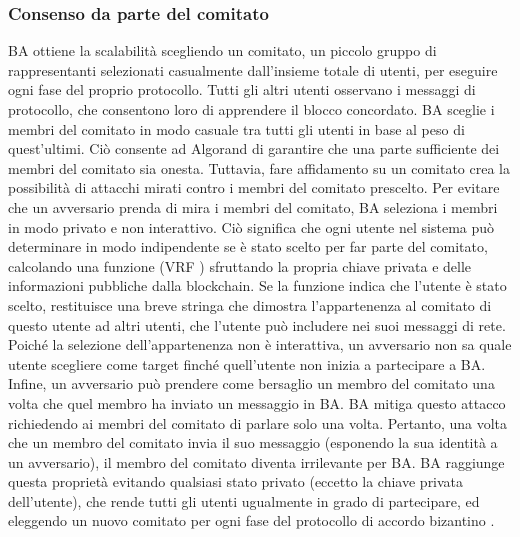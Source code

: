 \subsubsection{Consenso da parte del comitato}
BA ottiene la scalabilità scegliendo un comitato, un piccolo gruppo di rappresentanti selezionati casualmente dall'insieme totale di utenti, per eseguire ogni fase del proprio protocollo. Tutti gli altri utenti osservano i messaggi di protocollo, che consentono loro di apprendere il blocco concordato. BA sceglie i membri del comitato in modo casuale tra tutti gli utenti in base al peso di quest'ultimi. Ciò consente ad Algorand di garantire che una parte sufficiente dei membri del comitato sia onesta. Tuttavia, fare affidamento su un comitato crea la possibilità di attacchi mirati contro i membri del comitato prescelto. Per evitare che un avversario prenda di mira i membri del comitato, BA seleziona i membri in modo privato e non interattivo. Ciò significa che ogni utente nel sistema può determinare in modo indipendente se è stato scelto per far parte del comitato, calcolando una funzione (VRF \cite{814584}) sfruttando la propria chiave privata e delle informazioni pubbliche dalla blockchain. Se la funzione indica che l'utente è stato scelto, restituisce una breve stringa che dimostra l'appartenenza al comitato di questo utente ad altri utenti, che l'utente può includere nei suoi messaggi di rete. Poiché la selezione dell'appartenenza non è interattiva, un avversario non sa quale utente scegliere come target finché quell'utente non inizia a partecipare a BA. Infine, un avversario può prendere come bersaglio un membro del comitato una volta che quel membro ha inviato un messaggio in BA. BA mitiga questo attacco richiedendo ai membri del comitato di parlare solo una volta. Pertanto, una volta che un membro del comitato invia il suo messaggio (esponendo la sua identità a un avversario), il membro del comitato diventa irrilevante per BA. BA raggiunge questa proprietà evitando qualsiasi stato privato (eccetto la chiave privata dell'utente), che rende tutti gli utenti ugualmente in grado di partecipare, ed eleggendo un nuovo comitato per ogni fase del protocollo di accordo bizantino \cite{algorand-bizantine}.

